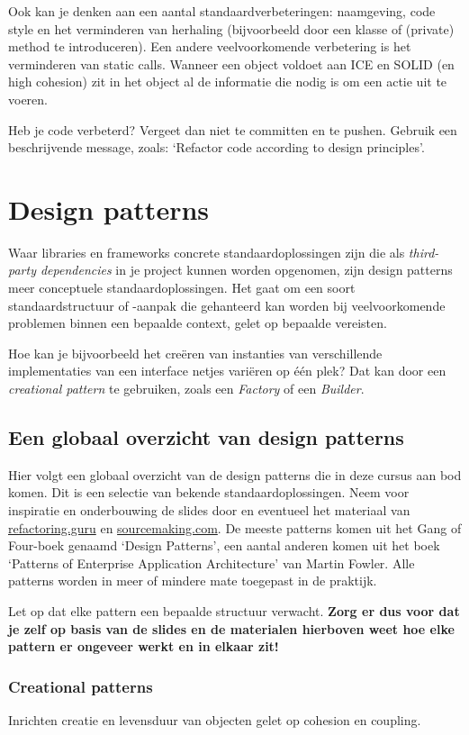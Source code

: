 \documentclass[dutch,a4paper,12pt,doubleside]{book}
\begin{document}
Ook kan je denken aan een aantal standaardverbeteringen:
naamgeving, code style en het verminderen van herhaling
(bijvoorbeeld door een klasse of (private) method te introduceren).
Een andere veelvoorkomende verbetering is het verminderen van static calls.
Wanneer een object voldoet aan ICE en SOLID (en high cohesion) zit 
in het object al de informatie die nodig is om een actie uit te voeren.

Heb je code verbeterd? Vergeet dan niet te committen en te pushen. Gebruik een 
beschrijvende message, zoals: `Refactor code according to design principles'.

\newpage
\section{Design patterns}
Waar libraries en frameworks concrete standaardoplossingen zijn die als 
\textit{third-party dependencies} in je project kunnen worden opgenomen,
zijn design patterns meer conceptuele standaardoplossingen. Het gaat om 
een soort standaardstructuur of -aanpak die gehanteerd kan worden bij 
veelvoorkomende problemen binnen een bepaalde context, gelet op bepaalde 
vereisten.

Hoe kan je bijvoorbeeld het creëren van instanties van verschillende implementaties van 
een interface netjes variëren op één plek? 
Dat kan door een \textit{creational pattern} te gebruiken,
zoals een \textit{Factory} of een \textit{Builder}.

\subsection{Een globaal overzicht van design patterns}
Hier volgt een globaal overzicht van de design patterns die in deze 
cursus aan bod komen. Dit is een selectie van bekende standaardoplossingen. 
Neem voor inspiratie en onderbouwing de slides door 
en eventueel het materiaal van \url{refactoring.guru} en \url{sourcemaking.com}.
De meeste patterns komen uit het Gang of Four-boek genaamd `Design Patterns',
een aantal anderen komen uit het boek `Patterns of Enterprise Application Architecture' van 
Martin Fowler. Alle patterns worden in meer of mindere mate toegepast in de praktijk.

Let op dat elke pattern een bepaalde structuur verwacht.
\textbf{Zorg er dus voor dat je zelf op basis van de slides
en de materialen hierboven weet hoe elke pattern er 
ongeveer werkt en in elkaar zit!}

\subsubsection{Creational patterns}
Inrichten creatie en levensduur van objecten
gelet op cohesion en coupling.
\end{document}
